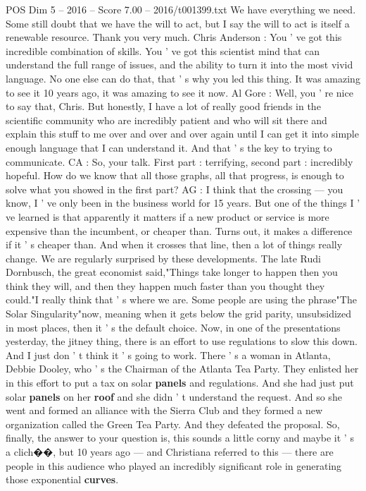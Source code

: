 \begin{textsample}{POS Dim 5 – 2016 – Score 7.00 – 2016/t001399.txt}
We have everything we need.
Some still doubt that we have the will to act, but I say the will to act is itself a renewable resource.
Thank you very much.
Chris Anderson : You ' ve got this incredible combination of skills.
You ' ve got this scientist mind that can understand the full range of issues, and the ability to turn it into the most vivid language.
No one else can do that, that ' s why you led this thing.
It was amazing to see it 10 years ago, it was amazing to see it now.
Al Gore : Well, you ' re nice to say that, Chris.
But honestly, I have a lot of really good friends in the scientific community who are incredibly patient and who will sit there and explain this stuff to me over and over and over again until I can get it into simple enough language that I can understand it.
And that ' s the key to trying to communicate.
CA : So, your talk.
First part : terrifying, second part : incredibly hopeful.
How do we know that all those graphs, all that progress, is enough to solve what you showed in the first part?
AG : I think that the crossing — you know, I ' ve only been in the business world for 15 years.
But one of the things I ' ve learned is that apparently it matters if a new product or service is more expensive than the incumbent, or cheaper than.
Turns out, it makes a difference if it ' s cheaper than.
And when it crosses that line, then a lot of things really change.
We are regularly surprised by these developments.
The late Rudi Dornbusch, the great economist said,"Things take longer to happen then you think they will, and then they happen much faster than you thought they could."I really think that ' s where we are.
Some people are using the phrase"The Solar Singularity"now, meaning when it gets below the grid parity, unsubsidized in most places, then it ' s the default choice.
Now, in one of the presentations yesterday, the jitney thing, there is an effort to use regulations to slow this down.
And I just don ' t think it ' s going to work.
There ' s a woman in Atlanta, Debbie Dooley, who ' s the Chairman of the Atlanta Tea Party.
They enlisted her in this effort to put a tax on solar \textbf{panels} and regulations.
And she had just put solar \textbf{panels} on her \textbf{roof} and she didn ' t understand the request.
And so she went and formed an alliance with the Sierra Club and they formed a new organization called the Green Tea Party.
And they defeated the proposal.
So, finally, the answer to your question is, this sounds a little corny and maybe it ' s a clich{\EmojiFont �}{\EmojiFont �}, but 10 years ago — and Christiana referred to this — there are people in this audience who played an incredibly significant role in generating those exponential \textbf{curves}.

\end{textsample}
